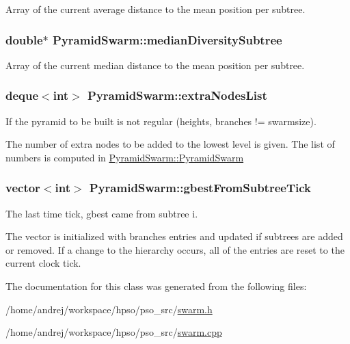 Array of the current average distance to the mean position per subtree. 

\hypertarget{classPyramidSwarm_309cbc58b3d57d9d0938b29f9c6a3370}{
\subsubsection{\setlength{\rightskip}{0pt plus 5cm}double$\ast$ {\bf PyramidSwarm::medianDiversitySubtree}}}
\label{classPyramidSwarm_309cbc58b3d57d9d0938b29f9c6a3370}


Array of the current median distance to the mean position per subtree. 

\hypertarget{classPyramidSwarm_6f8b00d4901f590cb7cc0fe78da593dc}{
\subsubsection{\setlength{\rightskip}{0pt plus 5cm}deque$<$int$>$ {\bf PyramidSwarm::extraNodesList}}}
\label{classPyramidSwarm_6f8b00d4901f590cb7cc0fe78da593dc}


If the pyramid to be built is not regular (heights, branches != swarmsize). 

The number of extra nodes to be added to the lowest level is given. The list of numbers is computed in \hyperlink{classPyramidSwarm_300ed83e7f46ecf8895d5ab8a0bb7ad8}{PyramidSwarm::PyramidSwarm} \hypertarget{classPyramidSwarm_73623ddb46a59321d00049c3ae64c459}{
\subsubsection{\setlength{\rightskip}{0pt plus 5cm}vector$<$int$>$ {\bf PyramidSwarm::gbestFromSubtreeTick}}}
\label{classPyramidSwarm_73623ddb46a59321d00049c3ae64c459}


The last time tick, gbest came from subtree i. 

The vector is initialized with branches entries and updated if subtrees are added or removed. If a change to the hierarchy occurs, all of the entries are reset to the current clock tick. 

The documentation for this class was generated from the following files:\begin{CompactItemize}
\item 
/home/andrej/workspace/hpso/pso\_\-src/\hyperlink{swarm_8h}{swarm.h}\item 
/home/andrej/workspace/hpso/pso\_\-src/\hyperlink{swarm_8cpp}{swarm.cpp}\end{CompactItemize}

